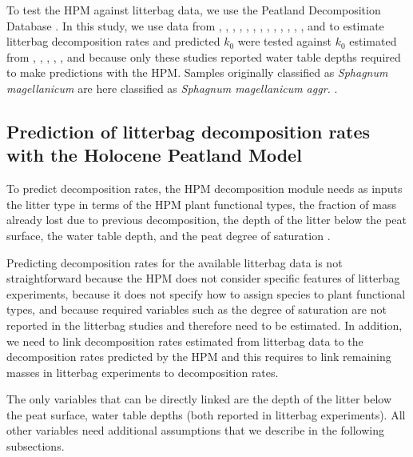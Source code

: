 \documentclass[esd, manuscript]{copernicus}
\begin{document}
To test the HPM against litterbag data, we use the Peatland Decomposition Database \citep{Teickner.2024c}. In this study, we use data from \citet{Bartsch.1985}, \citet{Vitt.1990}, \citet{Johnson.1991}, \citet{Szumigalski.1996}, \citet{Prevost.1997}, \citet{Scheffer.2001}, \citet{Thormann.2001}, \citet{Asada.2005b}, \citet{Trinder.2008}, \citet{Breeuwer.2008}, \citet{Strakova.2010}, \citet{Hagemann.2015}, \citet{Golovatskaya.2017}, and \citet{Makila.2018} to estimate litterbag decomposition rates and predicted \(k_0\) were tested against \(k_0\) estimated from \citet{Johnson.1991}, \citet{Szumigalski.1996}, \citet{Prevost.1997}, \citet{Strakova.2010}, \citet{Golovatskaya.2017}, and \citet{Makila.2018} because only these studies reported water table depths required to make predictions with the HPM. Samples originally classified as \emph{Sphagnum magellanicum} are here classified as \emph{Sphagnum magellanicum aggr.} \citep{Hassel.2018}.

\hypertarget{sdm-003-methods-2}{%
\subsection{Prediction of litterbag decomposition rates with the Holocene Peatland Model}\label{sdm-003-methods-2}}

To predict decomposition rates, the HPM decomposition module needs as inputs the litter type in terms of the HPM plant functional types, the fraction of mass already lost due to previous decomposition, the depth of the litter below the peat surface, the water table depth, and the peat degree of saturation \citep{Frolking.2010}.

Predicting decomposition rates for the available litterbag data is not straightforward because the HPM does not consider specific features of litterbag experiments, because it does not specify how to assign species to plant functional types, and because required variables such as the degree of saturation are not reported in the litterbag studies and therefore need to be estimated. In addition, we need to link decomposition rates estimated from litterbag data to the decomposition rates predicted by the HPM and this requires to link remaining masses in litterbag experiments to decomposition rates.

The only variables that can be directly linked are the depth of the litter below the peat surface, water table depths (both reported in litterbag experiments). All other variables need additional assumptions that we describe in the following subsections.
\end{document}
